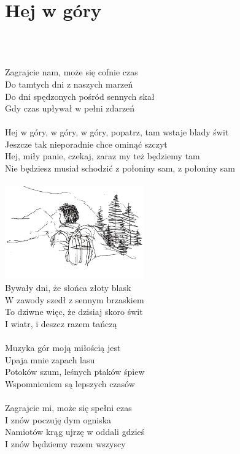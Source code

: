 \documentclass[a5paper, 10pt]{book}
\begin{document}
\newpage
\section{Hej w góry}\textcolor{lightgray}{\textit{}}\\~\\
\begin{minipage}[t]{0.9\textwidth}
Zagrajcie nam, może się cofnie czas\\
Do tamtych dni z naszych marzeń\\
Do dni spędzonych pośród sennych skał\\
Gdy czas upływał w pełni zdarzeń\\
\\
\hspace*{3mm}Hej w góry, w góry, w góry, popatrz, tam wstaje blady świt\\
\hspace*{3mm}Jeszcze tak nieporadnie chce ominąć szczyt\\
\hspace*{3mm}Hej, miły panie, czekaj, zaraz my też będziemy tam\\
\hspace*{3mm}Nie będziesz musiał schodzić z połoniny sam, z połoniny sam\\
\\
\includegraphics[height=40mm, right]{images/hej_w_gory.png}\vspace*{-40mm}\\
Bywały dni, że słońca złoty blask\\
W zawody szedł z sennym brzaskiem\\
To dziwne więc, że dzisiaj skoro świt\\
I wiatr, i deszcz razem tańczą\\
\\
Muzyka gór moją miłością jest\\
Upaja mnie zapach lasu\\
Potoków szum, leśnych ptaków śpiew\\
Wspomnieniem są lepszych czasów\\
\\
Zagrajcie mi, może się spełni czas\\
I znów poczuję dym ogniska\\
Namiotów krąg ujrzę w oddali gdzieś\\
I znów będziemy razem wszyscy\\
\end{minipage}
\end{document}
